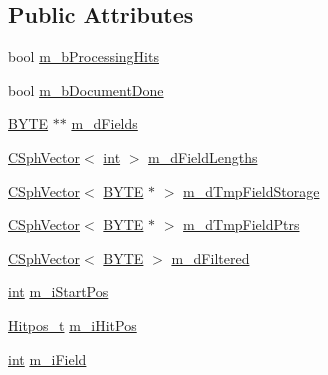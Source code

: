 \subsection*{Public Attributes}
\begin{DoxyCompactItemize}
\item 
bool \hyperlink{structCSphSource__Document_1_1CSphBuildHitsState__t_a3d889c868867e9a61d40cb90c63cd117}{m\-\_\-b\-Processing\-Hits}
\item 
bool \hyperlink{structCSphSource__Document_1_1CSphBuildHitsState__t_aefa1c14ef3cd2d79b0c3669dbbe4721a}{m\-\_\-b\-Document\-Done}
\item 
\hyperlink{sphinxstd_8h_a4ae1dab0fb4b072a66584546209e7d58}{B\-Y\-T\-E} $\ast$$\ast$ \hyperlink{structCSphSource__Document_1_1CSphBuildHitsState__t_ae3898cdf20dee7381884697f3115e8e6}{m\-\_\-d\-Fields}
\item 
\hyperlink{classCSphVector}{C\-Sph\-Vector}$<$ \hyperlink{sphinxexpr_8cpp_a4a26e8f9cb8b736e0c4cbf4d16de985e}{int} $>$ \hyperlink{structCSphSource__Document_1_1CSphBuildHitsState__t_a467598ca7e85174861450d770773c537}{m\-\_\-d\-Field\-Lengths}
\item 
\hyperlink{classCSphVector}{C\-Sph\-Vector}$<$ \hyperlink{sphinxstd_8h_a4ae1dab0fb4b072a66584546209e7d58}{B\-Y\-T\-E} $\ast$ $>$ \hyperlink{structCSphSource__Document_1_1CSphBuildHitsState__t_a299e45c09db53690803e26288477d2be}{m\-\_\-d\-Tmp\-Field\-Storage}
\item 
\hyperlink{classCSphVector}{C\-Sph\-Vector}$<$ \hyperlink{sphinxstd_8h_a4ae1dab0fb4b072a66584546209e7d58}{B\-Y\-T\-E} $\ast$ $>$ \hyperlink{structCSphSource__Document_1_1CSphBuildHitsState__t_ae49e1ee46d5a9b273a3ab6b4a5358b90}{m\-\_\-d\-Tmp\-Field\-Ptrs}
\item 
\hyperlink{classCSphVector}{C\-Sph\-Vector}$<$ \hyperlink{sphinxstd_8h_a4ae1dab0fb4b072a66584546209e7d58}{B\-Y\-T\-E} $>$ \hyperlink{structCSphSource__Document_1_1CSphBuildHitsState__t_aae9f1ccfab993f5774d8d4ea0a821d8e}{m\-\_\-d\-Filtered}
\item 
\hyperlink{sphinxexpr_8cpp_a4a26e8f9cb8b736e0c4cbf4d16de985e}{int} \hyperlink{structCSphSource__Document_1_1CSphBuildHitsState__t_a4a7254c913ebaffb709dec6bac772412}{m\-\_\-i\-Start\-Pos}
\item 
\hyperlink{sphinx_8h_af1385e83d53e0648b15eae6d8f101847}{Hitpos\-\_\-t} \hyperlink{structCSphSource__Document_1_1CSphBuildHitsState__t_ae3b36147dc90571913804918e5cda4aa}{m\-\_\-i\-Hit\-Pos}
\item 
\hyperlink{sphinxexpr_8cpp_a4a26e8f9cb8b736e0c4cbf4d16de985e}{int} \hyperlink{structCSphSource__Document_1_1CSphBuildHitsState__t_ae8d19ea63e091bb6cb9e7c0d1239d3ec}{m\-\_\-i\-Field}
$$
\end{DoxyCompactItemize}
